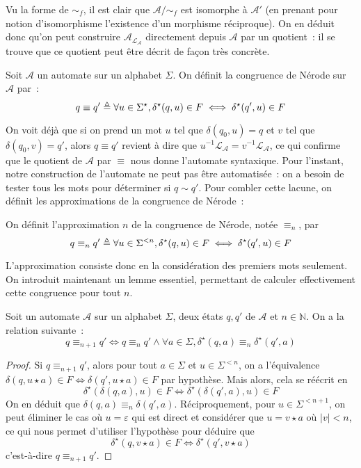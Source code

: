 Vu la forme de $\sim_f$, il est clair que $\mathcal A/{\sim_f}$ est isomorphe à
$\mathcal A'$ (en prenant pour notion d'isomorphisme l'existence d'un morphisme
réciproque). On en déduit donc qu'on peut construire
$\mathcal A_{\mathcal L_\mathcal A}$ directement depuis $\mathcal A$ par un
quotient~: il se trouve que ce quotient peut être décrit de façon très concrète.

\begin{definition}
  Soit $\mathcal A$ un automate sur un alphabet $\Sigma$. On définit la
  congruence de Nérode sur $\mathcal A$ par~:
  \[q \equiv q' \triangleq \forall u \in \Sigma^\star,
  \delta^\star(q,u) \in F \iff \delta^\star(q',u) \in F\]
\end{definition}

On voit déjà que si on prend un mot $u$ tel que $\delta(q_0,u) = q$ et $v$ tel
que $\delta(q_0,v) = q'$, alors $q \equiv q'$ revient à dire que
$u^{-1}\mathcal L_\mathcal A = v^{-1}\mathcal L_\mathcal A$, ce qui confirme que
le quotient de $\mathcal A$ par $\equiv$ nous donne l'automate syntaxique. Pour
l'instant, notre construction de l'automate ne peut pas être automatisée~: on a
besoin de tester tous les mots pour déterminer si $q\sim q'$. Pour combler
cette lacune, on définit les approximations de la congruence de Nérode~:

\begin{definition}
  On définit l'approximation $n$ de la congruence de Nérode, notée $\equiv_n$,
  par
  \[q\equiv_n q' \triangleq \forall u \in \Sigma^{<n}, \delta^\star(q,u)\in F \iff
  \delta^\star(q',u) \in F\]
\end{definition}

L'approximation consiste donc en la considération des premiers mots seulement.
On introduit maintenant un lemme essentiel, permettant de calculer effectivement
cette congruence pour tout $n$.

\begin{lemma}\label{lem.nerode.succ}
  Soit un automate $\mathcal A$ sur un alphabet $\Sigma$, deux états $q,q'$ de
  $\mathcal A$ et $n \in \mathbb N$. On a la relation suivante~:
  \[q \equiv_{n+1} q' \iff q\equiv_n q' \land \forall a \in \Sigma,
  \delta^\star(q,a)\equiv_n \delta^\star(q',a)\]
\end{lemma}

\begin{proof}
  Si $q\equiv_{n+1} q'$, alors pour tout $a\in \Sigma$ et $u \in \Sigma^{<n}$,
  on a l'équivalence $\delta(q,u\star a) \in F \iff \delta(q',u\star a) \in F$
  par hypothèse. Mais alors, cela se réécrit en
  \[\delta^\star(\delta(q,a),u)\in F \iff \delta^\star(\delta(q',a),u)\in F\]
  On en déduit que $\delta(q,a)\equiv_n \delta(q',a)$. Réciproquement, pour
  $u \in \Sigma^{< n + 1}$, on peut éliminer le cas où $u = \varepsilon$ qui est
  direct et considérer que $u = v\star a$ où $|v| < n$, ce qui nous permet
  d'utiliser l'hypothèse pour déduire que
  \[\delta^\star(q,v\star a)\in F \iff \delta^\star(q',v\star a)\]
  c'est-à-dire $q\equiv_{n+1} q'$.
\end{proof}

